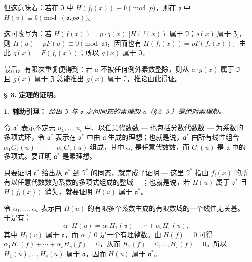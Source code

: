 但这意味着：若在 $\mathfrak{I}$ 中 $H(f_i(x)) \equiv 0 \pmod{p}$，则在 $\mathfrak{o}$ 中 $H(u) \equiv 0 \pmod{(\mathfrak{a}, p\mathfrak{o})}$。

这可改写为：若 $H(f(x)) = p \cdot g(x)$ [$H(f(x))$ 属于 $\mathfrak{I}$；$g(x)$ 属于 $\mathfrak{Z}$]，则 $H(u) - pF(u) \equiv 0 \pmod{\mathfrak{a}}$，因而也有 $H(f_i(x)) = pF(f_i(x))$，由此 $g(x) = F(f_i(x))$；所以 $g(x)$ 属于 $\mathfrak{I}$。

最后，有限次重复便得到：若 $a$ 不被任何例外素数整除，则从 $a \cdot g(x)$ 属于 $\mathfrak{I}$ 且 $g(x)$ 属于 $\mathfrak{Z}$ 总能推出 $g(x)$ 属于 $\mathfrak{I}$，推论由此得证。

\newpage
\S~\textbf{3.}
\textbf{定理的证明。}

\smallskip

\noindent\textbf{1.} \textbf{辅助引理：}
\textit{给出 $\mathfrak{I}$ 与 $\mathfrak{o}$ 之间同态的素理想 $\mathfrak{a}$（\S\,2, 3.）是绝对素理想。}

令 $\mathfrak{o}^*$ 表示不定元 $u_1,\ldots,u_t$ 中、以任意代数数 --- 也包括分数代数数 --- 为系数的多项式环，令 $\mathfrak{a}^*$ 表示在 $\mathfrak{o}^*$ 中由 $\mathfrak{a}$ 生成的理想；也就是说，$\mathfrak{a}^*$ 由所有线性组合 $\alpha_1 G_1(u) + \cdots + \alpha_s G_s(u)$ 组成，其中 $\alpha_i$ 是任意代数数，而 $G_i(u)$ 是 $\mathfrak{a}$ 中的多项式。要证明 $\mathfrak{a}^*$ 是素理想。

只要证明 $\mathfrak{a}^*$ 给出从 $\mathfrak{o}^*$ 到 $\mathfrak{I}^*$ 的同态，就完成了证明 --- 这里 $\mathfrak{I}^*$ 指由 $f_i(x)$ 的所有以任意代数数为系数的多项式组成的整域 ---；也就是说，若 $H(u)$ 属于 $\mathfrak{o}^*$ 且 $H(f_i(x))$ 消失，就要证明 $H(u)$ 属于 $\mathfrak{a}^*$。

令 $\alpha_1,\ldots,\alpha_s$ 表示由 $H(u)$ 的有限多个系数生成的有限数域的一个线性无关基。于是有：
\[
\alpha \cdot H(u) = \alpha_1 H_1(u) + \cdots + \alpha_s H_s(u),
\]
其中 $H_i(u)$ 属于 $\mathfrak{o}$，而 $\alpha \neq 0$ 是一个有理整数。由 $H(f) = 0$ 可得 $\alpha_1 H_1(f) + \cdots + \alpha_s H_s(f) = 0$，从而 $H_1(f) = 0,\ldots, H_s(f) = 0$。所以 $H_1(u),\ldots,H_s(u)$ 属于 $\mathfrak{a}$，因而 $H(u)$ 属于 $\mathfrak{a}^*$。


